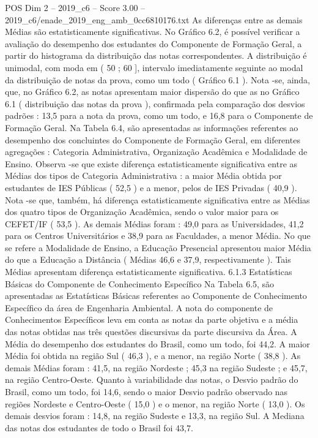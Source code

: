 \begin{textsample}{POS Dim 2 – 2019\_c6 – Score 3.00 – 2019\_c6/enade\_2019\_eng\_amb\_0cc6810176.txt}
As diferenças entre as demais Médias são estatisticamente significativas.
No Gráfico 6.2, é possível verificar a avaliação do desempenho dos estudantes do Componente de Formação Geral, a partir do histograma da distribuição das notas correspondentes.
A distribuição é unimodal, com moda em ( 50 ; 60 ], intervalo imediatamente seguinte ao modal da distribuição de notas da prova, como um todo ( Gráfico 6.1 ).
Nota -se, ainda, que, no Gráfico 6.2, as notas apresentam maior dispersão do que as no Gráfico 6.1 ( distribuição das notas da prova ), confirmada pela comparação dos desvios padrões : 13,5 para a nota da prova, como um todo, e 16,8 para o Componente de Formação Geral.
Na Tabela 6.4, são apresentadas as informações referentes ao desempenho dos concluintes do Componente de Formação Geral, em diferentes agregações : Categoria Administrativa, Organização Acadêmica e Modalidade de Ensino.
Observa -se que existe diferença estatisticamente significativa entre as Médias dos tipos de Categoria Administrativa : a maior Média obtida por estudantes de IES Públicas ( 52,5 ) e a menor, pelos de IES Privadas ( 40,9 ).
Nota -se que, também, há diferença estatisticamente significativa entre as Médias dos quatro tipos de Organização Acadêmica, sendo o valor maior para os CEFET/IF ( 53,5 ).
As demais Médias foram : 49,0 para as Universidades, 41,2 para os Centros Universitários e 38,9 para as Faculdades, a menor Média.
No que se refere a Modalidade de Ensino, a Educação Presencial apresentou maior Média do que a Educação a Distância ( Médias 46,6 e 37,9, respectivamente ).
Tais Médias apresentam diferença estatisticamente significativa. 6.1.3 Estatísticas Básicas do Componente de Conhecimento Específico Na Tabela 6.5, são apresentadas as Estatísticas Básicas referentes ao Componente de Conhecimento Específico da área de Engenharia Ambiental.
A nota do componente de Conhecimentos Específicos leva em conta as notas da parte objetiva e a média das notas obtidas nas três questões discursivas da parte discursiva da Área.
A Média do desempenho dos estudantes do Brasil, como um todo, foi 44,2.
A maior Média foi obtida na região Sul ( 46,3 ), e a menor, na região Norte ( 38,8 ).
As demais Médias foram : 41,5, na região Nordeste ; 45,3 na região Sudeste ; e 45,7, na região Centro-Oeste.
Quanto à variabilidade das notas, o Desvio padrão do Brasil, como um todo, foi 14,6, sendo o maior Desvio padrão observado nas regiões Nordeste e Centro-Oeste ( 15,0 ) e o menor, na região Norte ( 13,0 ).
Os demais desvios foram : 14,8, na região Sudeste e 13,3, na região Sul.
A Mediana das notas dos estudantes de todo o Brasil foi 43,7.

\end{textsample}
